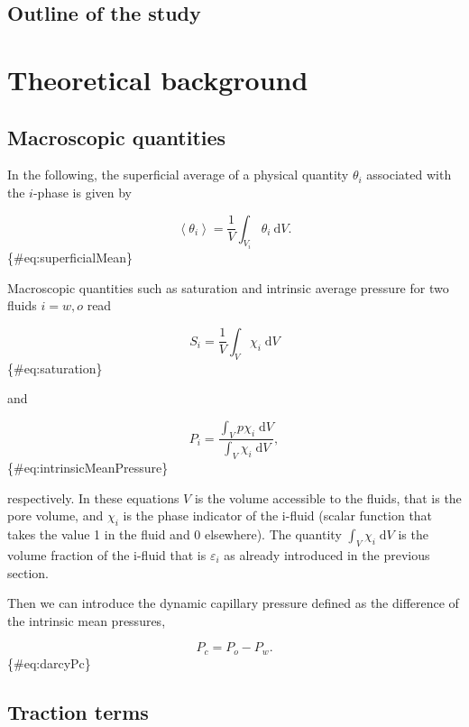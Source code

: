 \documentclass[]{article}
\begin{document}
\hypertarget{outline-of-the-study}{%
\subsection{Outline of the study}\label{outline-of-the-study}}

\hypertarget{theoretical-background}{%
\section{Theoretical background}\label{theoretical-background}}

\hypertarget{macroscopic-quantities}{%
\subsection{Macroscopic quantities}\label{macroscopic-quantities}}

In the following, the superficial average of a physical quantity
\(\theta_i\) associated with the \(i\)-phase is given by

\[
\left\langle \theta_{i}\right\rangle =\frac{1}{V}\int_{V_{i}}\theta_{i}\:\mathrm{d}V.
\] \{\#eq:superficialMean\}

Macroscopic quantities such as saturation and intrinsic average pressure
for two fluids \(i=w,o\) read

\[
S_i = \frac{1}{V} \int_{V}\chi_{i}\;\mathrm{d}V
\] \{\#eq:saturation\}

and

\[
P_{i}=\frac{\int_{V}p\chi_{i}\;\mathrm{d}V}{\int_{V}\chi_{i}\;\mathrm{d}V},
\] \{\#eq:intrinsicMeanPressure\}

respectively. In these equations \(V\) is the volume accessible to the
fluids, that is the pore volume, and \(\chi_i\) is the phase indicator
of the i-fluid (scalar function that takes the value 1 in the fluid and
0 elsewhere). The quantity \(\int_{V}\chi_{i}\;\mathrm{d}V\) is the
volume fraction of the i-fluid that is \(\varepsilon_{i}\) as already
introduced in the previous section.

Then we can introduce the dynamic capillary pressure defined as the
difference of the intrinsic mean pressures,

\[
P_{c}=P_{o}-P_{w}.
\] \{\#eq:darcyPc\}

\hypertarget{traction-terms}{%
\subsection{Traction terms}\label{traction-terms}}
\end{document}
